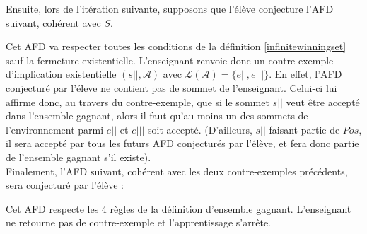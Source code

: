 \documentclass[12pt,a4paper,oneside,titlepage]{report}
\newcommand{\unary}[1][1.5ex]{\rule{1pt}{#1}}
\begin{document}
Ensuite, lors de l'itération suivante, supposons que l'élève conjecture l'AFD suivant, cohérent avec $S$.

\begin{figure}[H]
\centering
{}
\end{figure}
\noindent Cet AFD va respecter toutes les conditions de la définition \ref{infinitewinningset} sauf la fermeture existentielle. L'enseignant renvoie donc un contre-exemple d'implication existentielle $(s||, \mathcal{A})$ avec $\mathcal{L}(\mathcal{A})=\{e||,e|||\}$. En effet, l'AFD conjecturé par l'éleve ne contient pas de sommet de l'enseignant. Celui-ci lui affirme donc, au travers du contre-exemple, que si le sommet $s||$ veut être accepté dans l'ensemble gagnant, alors il faut qu'au moins un des sommets de l'environnement parmi $e||$ et $e|||$ soit accepté. (D'ailleurs, $s||$ faisant partie de $Pos$, il sera accepté par tous les futurs AFD conjecturés par l'élève, et fera donc partie de l'ensemble gagnant s'il existe).\\

Finalement, l'AFD suivant, cohérent avec les deux contre-exemples précédents, sera conjecturé par l'élève :

\begin{figure}[H]
\centering
{}
\end{figure}
\noindent Cet AFD respecte les 4 règles de la définition d'ensemble gagnant. L'enseignant ne retourne pas de contre-exemple et l'apprentissage s'arrête. 
\end{document}

